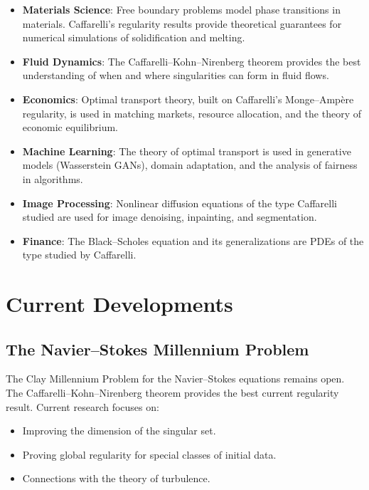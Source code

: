 \begin{itemize}
\item \textbf{Materials Science}: Free boundary problems model phase transitions in materials. Caffarelli's regularity results provide theoretical guarantees for numerical simulations of solidification and melting.

\item \textbf{Fluid Dynamics}: The Caffarelli--Kohn--Nirenberg theorem provides the best understanding of when and where singularities can form in fluid flows.

\item \textbf{Economics}: Optimal transport theory, built on Caffarelli's Monge--Amp\`ere regularity, is used in matching markets, resource allocation, and the theory of economic equilibrium.

\item \textbf{Machine Learning}: The theory of optimal transport is used in generative models (Wasserstein GANs), domain adaptation, and the analysis of fairness in algorithms.

\item \textbf{Image Processing}: Nonlinear diffusion equations of the type Caffarelli studied are used for image denoising, inpainting, and segmentation.

\item \textbf{Finance}: The Black--Scholes equation and its generalizations are PDEs of the type studied by Caffarelli.
\end{itemize}

\section{Current Developments}

\subsection{The Navier--Stokes Millennium Problem}

The Clay Millennium Problem for the Navier--Stokes equations remains open. The Caffarelli--Kohn--Nirenberg theorem provides the best current regularity result. Current research focuses on:
\begin{itemize}
\item Improving the dimension of the singular set.
\item Proving global regularity for special classes of initial data.
\item Connections with the theory of turbulence.
\end{itemize}

